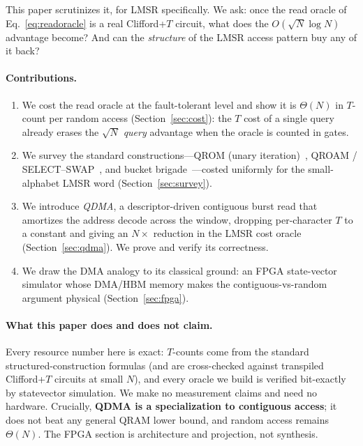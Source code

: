 \documentclass[11pt]{article}
\theoremstyle{definition}
\begin{document}
This paper scrutinizes it, for LMSR specifically. We ask: once the read oracle of
Eq.~\eqref{eq:readoracle} is a real Clifford+$T$ circuit, what does the
$O(\sqrt{N}\log N)$ advantage become? And can the \emph{structure} of the LMSR
access pattern buy any of it back?

\paragraph{Contributions.}
\begin{enumerate}
  \item We cost the read oracle at the fault-tolerant level and show it is
  $\Theta(N)$ in $T$-count per random access (Section~\ref{sec:cost}): the $T$
  cost of a single query already erases the $\sqrt{N}$ \emph{query} advantage when
  the oracle is counted in gates.
  \item We survey the standard constructions---QROM (unary
  iteration)~\cite{babbush2018encoding}, QROAM / SELECT--SWAP~\cite{low2024trading,
  berry2019qubitization}, and bucket brigade~\cite{giovannetti2008architectures,
  dimatteo2020faulttolerant}---costed uniformly for the small-alphabet LMSR word
  (Section~\ref{sec:survey}).
  \item We introduce \emph{QDMA}, a descriptor-driven contiguous burst read that
  amortizes the address decode across the window, dropping per-character $T$ to a
  constant and giving an $N\times$ reduction in the LMSR cost oracle
  (Section~\ref{sec:qdma}). We prove and verify its correctness.
  \item We draw the DMA analogy to its classical ground: an FPGA state-vector
  simulator whose DMA/HBM memory makes the contiguous-vs-random argument physical
  (Section~\ref{sec:fpga}).
\end{enumerate}

\paragraph{What this paper does and does not claim.}
Every resource number here is exact: $T$-counts come from the standard
structured-construction formulas (and are cross-checked against transpiled
Clifford+$T$ circuits at small $N$), and every oracle we build is verified
bit-exactly by statevector simulation. We make no measurement claims and need no
hardware. Crucially, \textbf{QDMA is a specialization to contiguous access}; it
does not beat any general QRAM lower bound, and random access remains $\Theta(N)$.
The FPGA section is architecture and projection, not synthesis.
\end{document}
